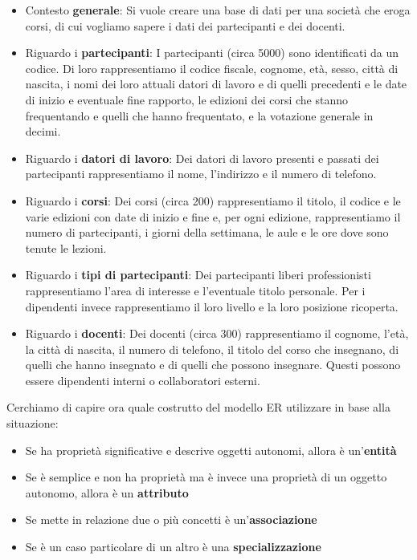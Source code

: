 \documentclass[11pt, a4paper, titlepage, oneside]{scrbook}
\begin{document}
\begin{itemize}
    \item Contesto \textbf{generale}: Si vuole creare una base di dati per una società che eroga corsi, di cui vogliamo sapere i dati dei partecipanti e dei docenti.
    \item Riguardo i \textbf{partecipanti}: I partecipanti (circa 5000) sono identificati da un codice. Di loro rappresentiamo il codice fiscale, cognome, età, sesso, città di nascita, i nomi dei loro attuali datori di lavoro e di quelli precedenti e le date di inizio e eventuale fine rapporto, le edizioni dei corsi che stanno frequentando e quelli che hanno frequentato, e la votazione generale in decimi.
    \item Riguardo i \textbf{datori di lavoro}: Dei datori di lavoro presenti e passati dei partecipanti rappresentiamo il nome, l'indirizzo e il numero di telefono.
    \item Riguardo i \textbf{corsi}: Dei corsi (circa 200) rappresentiamo il titolo, il codice e le varie edizioni con date di inizio e fine e, per ogni edizione, rappresentiamo il numero di partecipanti, i giorni della settimana, le aule e le ore dove sono tenute le lezioni.
    \item Riguardo i \textbf{tipi di partecipanti}: Dei partecipanti liberi professionisti rappresentiamo l'area di interesse e l'eventuale titolo personale. Per i dipendenti invece rappresentiamo il loro livello e la loro posizione ricoperta.
    \item Riguardo i \textbf{docenti}: Dei docenti (circa 300) rappresentiamo il cognome, l'età, la città di nascita, il numero di telefono, il titolo del corso che insegnano, di quelli che hanno insegnato e di quelli che possono insegnare. Questi possono essere dipendenti interni o collaboratori esterni.
\end{itemize}

Cerchiamo di capire ora quale costrutto del modello ER utilizzare in base alla situazione:
\begin{itemize}
    \item Se ha proprietà significative e descrive oggetti autonomi, allora è un'\textbf{entità}
    \item Se è semplice e non ha proprietà ma è invece una proprietà di un oggetto autonomo, allora è un \textbf{attributo}
    \item Se mette in relazione due o più concetti è un'\textbf{associazione}
    \item Se è un caso particolare di un altro è una \textbf{specializzazione}
\end{itemize}
\end{document}
